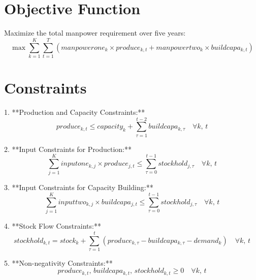 \documentclass{article}
\begin{document}
\section*{Objective Function}

Maximize the total manpower requirement over five years:
\[
\max \sum_{k=1}^{K} \sum_{t=1}^{T} (manpowerone_{k} \times produce_{k,t} + manpowertwo_{k} \times buildcapa_{k,t})
\]

\section*{Constraints}

1. **Production and Capacity Constraints:**
   \[
   produce_{k,t} \leq capacity_{k} + \sum_{\tau=1}^{t-2} buildcapa_{k,\tau} \quad \forall k, \, t
   \]

2. **Input Constraints for Production:**
   \[
   \sum_{j=1}^{K} inputone_{k,j} \times produce_{j,t} \leq \sum_{\tau=0}^{t-1} stockhold_{j,\tau} \quad \forall k, \, t
   \]

3. **Input Constraints for Capacity Building:**
   \[
   \sum_{j=1}^{K} inputtwo_{k,j} \times buildcapa_{j,t} \leq \sum_{\tau=0}^{t-1} stockhold_{j,\tau} \quad \forall k, \, t
   \]

4. **Stock Flow Constraints:**
   \[
   stockhold_{k,t} = stock_{k} + \sum_{\tau=1}^{t} (produce_{k,\tau} - buildcapa_{k,\tau} - demand_{k}) \quad \forall k, \, t
   \]

5. **Non-negativity Constraints:**
   \[
   produce_{k,t}, \, buildcapa_{k,t}, \, stockhold_{k,t} \geq 0 \quad \forall k, \, t
   \]
\end{document}
